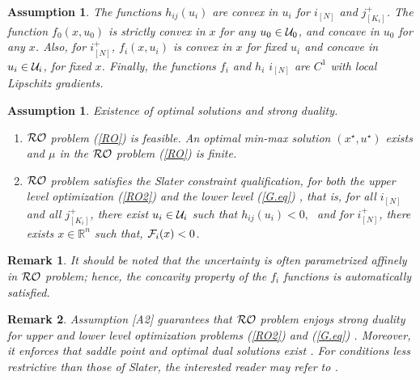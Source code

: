 \documentclass[journal,twoside,web]{ieeecolor}
\newtheorem{assumption}[theorem]{Assumption}
\newtheorem{remark}{Remark}
\begin{document}
\begin{assumption}\label{assume1} The functions $h_{ij}(u_i)$ are convex in $u_i$ for $i_{[N]}$ and $j^+_{[K_i]}$.
The function $f_0(x,u_0)$ is strictly convex in $x$ for any $u_0\in {\cal U}_0$, and concave in $u_0$ for any $x$. Also, for $i^+_{[N]}$, $f_i(x,u_i)$ is convex in $x$ for fixed $u_i$ and concave in $u_i\in {\cal U}_i$, for fixed $x$.
Finally, the functions $f_i$ and $h_i$ $i_{[N]}$ are $C^1$ with local Lipschitz gradients.
\end{assumption}

\begin{assumption} \label{assume_feasible} Existence of optimal solutions and strong duality.

\begin{enumerate}
\item [A1] ${\cal RO}$ problem (\ref{RO}) is feasible. An optimal min-max solution $(x^\star,u^\star)$ exists and $\mu$ in the ${\cal RO}$ problem (\ref{RO}) is finite.
\item [A2] ${\cal RO}$ problem satisfies the Slater constraint qualification, for both the upper level optimization (\ref{RO2}) and the lower level (\ref{G.eq})
 \cite{bental2009-2}, that is,
for all $i_{[N]}$ and all $j^+_{[K_i]}$, there exist $u_i \in {\cal U}_i$ such that $h_{ij}(u_i)<0,\;$  and
for $i^+_{[N]}$,  there exists $x \in \mathbb{R}^n$ such that, ${\cal F}_i(x)<0$\;.
\end{enumerate}
\end{assumption}
\begin{remark}
    It should be noted that the uncertainty is often parametrized affinely in ${\cal RO}$ problem; hence, the concavity property of the $f_i$ functions is automatically satisfied.
\end{remark}
\begin{remark} \label{strong_duality_rem}
Assumption [A2] guarantees that ${\cal RO}$ problem enjoys strong duality for upper and lower level optimization problems (\ref{RO2}) and (\ref{G.eq}) \cite[Section~5.2.3, 5.9.1]{boyd2004}. Moreover, it enforces that saddle point and optimal dual solutions exist \cite{bental2009-2}. For conditions less restrictive than those of Slater, the interested reader may refer to \cite{jeyakumar2010}.
\end{remark}
\end{document}
